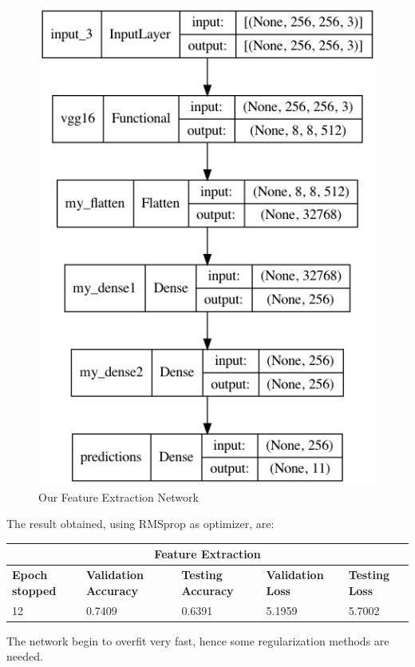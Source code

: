 \begin{figure}[H]
	\centering
	\includegraphics[height=0.5\textwidth]{img/vgg16/vgg16fe1.png}
	\caption{Our Feature Extraction Network}
	\label{fig:vgg16fe1}
\end{figure}


\noindent The result obtained, using RMSprop as optimizer, are:

\medskip

\begin{tabular}{ |p{2cm}|p{2cm}|p{2cm}|p{2cm}|p{2cm}|  }
\hline
\multicolumn{5}{|c|}{Feature Extraction} \\
\hline
\textbf{Epoch stopped} & \textbf{Validation Accuracy} & \textbf{Testing Accuracy} & \textbf{Validation Loss} & \textbf{Testing Loss} \\
\hline
12 & 0.7409 & 0.6391 & 5.1959 & 5.7002\\
\hline
\end{tabular}

\medskip

 \noindent The network begin to overfit very fast, hence some regularization methods are needed.


